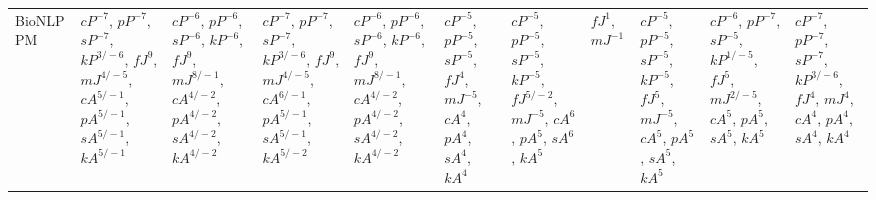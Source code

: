 \documentclass[letterpaper]{article} %
\begin{document}
\begin{sidewaystable*}
\begin{tabular}{l l l l l l l l l l l }
\multirow{10}{1.7cm}{BioNLP PM} & \multirow{10}{1.7cm}{$cP^{-7}$, $pP^{-7}$, $sP^{-7}$, $kP^{3/-6}$, $fJ^{9}$, $mJ^{4/-5}$, $cA^{5/-1}$, $pA^{5/-1}$, $sA^{5/-1}$, $kA^{5/-1}$} & \multirow{10}{1.7cm}{$cP^{-6}$, $pP^{-6}$, $sP^{-6}$, $kP^{-6}$, $fJ^{9}$, $mJ^{8/-1}$, $cA^{4/-2}$, $pA^{4/-2}$, $sA^{4/-2}$, $kA^{4/-2}$} & \multirow{10}{1.7cm}{$cP^{-7}$, $pP^{-7}$, $sP^{-7}$, $kP^{3/-6}$, $fJ^{9}$, $mJ^{4/-5}$, $cA^{6/-1}$, $pA^{5/-1}$, $sA^{5/-1}$, $kA^{5/-2}$} & \multirow{10}{1.7cm}{$cP^{-6}$, $pP^{-6}$, $sP^{-6}$, $kP^{-6}$, $fJ^{9}$, $mJ^{8/-1}$, $cA^{4/-2}$, $pA^{4/-2}$, $sA^{4/-2}$, $kA^{4/-2}$} & \multirow{10}{1.7cm}{$cP^{-5}$, $pP^{-5}$, $sP^{-5}$, $fJ^{4}$, $mJ^{-5}$, $cA^{4}$, $pA^{4}$, $sA^{4}$, $kA^{4}$} & \multirow{10}{1.7cm}{$cP^{-5}$, $pP^{-5}$, $sP^{-5}$, $kP^{-5}$, $fJ^{5/-2}$, $mJ^{-5}$, $cA^{6}$, $pA^{5}$, $sA^{6}$, $kA^{5}$} & \multirow{10}{1.7cm}{$fJ^{1}$, $mJ^{-1}$} & \multirow{10}{1.7cm}{$cP^{-5}$, $pP^{-5}$, $sP^{-5}$, $kP^{-5}$, $fJ^{5}$, $mJ^{-5}$, $cA^{5}$, $pA^{5}$, $sA^{5}$, $kA^{5}$} & \multirow{10}{1.7cm}{$cP^{-6}$, $pP^{-7}$, $sP^{-5}$, $kP^{1/-5}$, $fJ^{5}$, $mJ^{2/-5}$, $cA^{5}$, $pA^{5}$, $sA^{5}$, $kA^{5}$} & \multirow{10}{1.7cm}{$cP^{-7}$, $pP^{-7}$, $sP^{-7}$, $kP^{3/-6}$, $fJ^{4}$, $mJ^{4}$, $cA^{4}$, $pA^{4}$, $sA^{4}$, $kA^{4}$} \\ \\ \\ \\ \\ \\ \\ \\ \\ \\
\midrule

\end{tabular}
\end{sidewaystable*}
\end{document}
